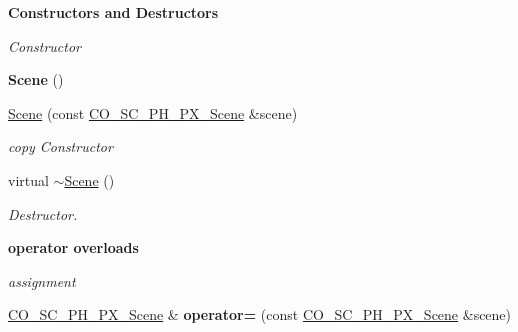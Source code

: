 \begin{Indent}{\bf Constructors and Destructors}\par
{\em \label{_amgrp64fb2b8a2107864a2f56d3f7cc47f3aa}
 Constructor }\begin{DoxyCompactItemize}
\item 
\hypertarget{classContent_1_1Scene_1_1Physics_1_1PhysX_1_1Scene_ada4912f01c4a88adc43c309f2632e04b}{
{\bfseries Scene} ()}
\label{classContent_1_1Scene_1_1Physics_1_1PhysX_1_1Scene_ada4912f01c4a88adc43c309f2632e04b}

\item 
\hypertarget{classContent_1_1Scene_1_1Physics_1_1PhysX_1_1Scene_a7ca93285dfa948cccfcfd45b0c335dfb}{
\hyperlink{classContent_1_1Scene_1_1Physics_1_1PhysX_1_1Scene_a7ca93285dfa948cccfcfd45b0c335dfb}{Scene} (const \hyperlink{classContent_1_1Scene_1_1Physics_1_1PhysX_1_1Scene}{CO\_\-SC\_\-PH\_\-PX\_\-Scene} \&scene)}
\label{classContent_1_1Scene_1_1Physics_1_1PhysX_1_1Scene_a7ca93285dfa948cccfcfd45b0c335dfb}

\begin{DoxyCompactList}\small\item\em copy Constructor \item\end{DoxyCompactList}\item 
\hypertarget{classContent_1_1Scene_1_1Physics_1_1PhysX_1_1Scene_a6dd679339bc0f00570919da2c2a5dcd6}{
virtual \hyperlink{classContent_1_1Scene_1_1Physics_1_1PhysX_1_1Scene_a6dd679339bc0f00570919da2c2a5dcd6}{$\sim$Scene} ()}
\label{classContent_1_1Scene_1_1Physics_1_1PhysX_1_1Scene_a6dd679339bc0f00570919da2c2a5dcd6}

\begin{DoxyCompactList}\small\item\em Destructor. \item\end{DoxyCompactList}\end{DoxyCompactItemize}
\end{Indent}
\begin{Indent}{\bf operator overloads}\par
{\em \label{_amgrp2b6b4abd74032bbca52fca7f70100c25}
 assignment }\begin{DoxyCompactItemize}
\item 
\hypertarget{classContent_1_1Scene_1_1Physics_1_1PhysX_1_1Scene_a1da41bfa00897fea90911dc32a18dd78}{
\hyperlink{classContent_1_1Scene_1_1Physics_1_1PhysX_1_1Scene}{CO\_\-SC\_\-PH\_\-PX\_\-Scene} \& {\bfseries operator=} (const \hyperlink{classContent_1_1Scene_1_1Physics_1_1PhysX_1_1Scene}{CO\_\-SC\_\-PH\_\-PX\_\-Scene} \&scene)}
\label{classContent_1_1Scene_1_1Physics_1_1PhysX_1_1Scene_a1da41bfa00897fea90911dc32a18dd78}

\end{DoxyCompactItemize}
\end{Indent}
